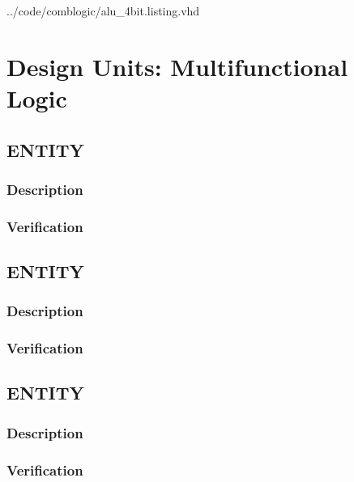 \documentclass[10pt,a4paper]{report}
\begin{document}
\pagebreak


{../code/comblogic/alu_4bit.listing.vhd}


\chapter{Design Units: Multifunctional Logic}

\section{ENTITY}
\subsection{Description}

\subsection{Verification}

\pagebreak
\section{ENTITY}
\subsection{Description}

\subsection{Verification}

\pagebreak
\section{ENTITY}
\subsection{Description}

\subsection{Verification}
\end{document}
